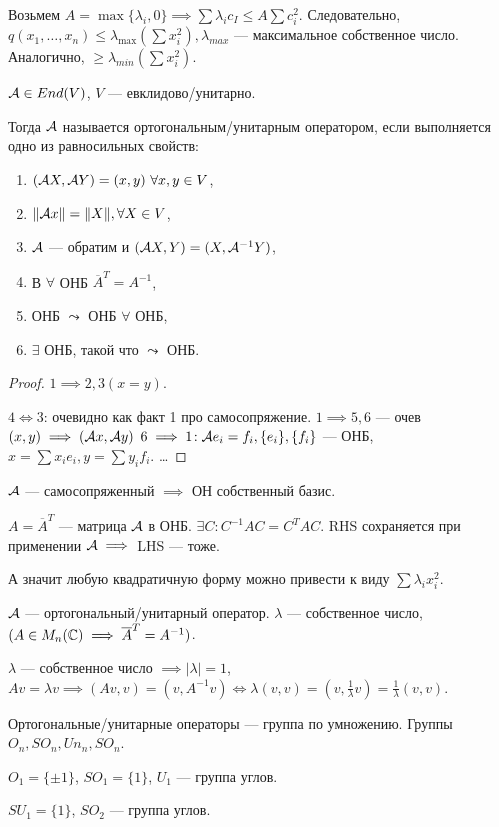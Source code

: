 Возьмем  $A = \max \{\lambda_i, 0\} \implies \sum \lambda_i c_I \le A \sum c_i^2$. Следовательно, $q(x_1, \ldots ,x_n) \le \lambda_{\max} (\sum x_i^2), \lambda_{max}$ --- максимальное собственное число.  Аналогично, $\ge \lambda_{min}(\sum x_i^2)$.
\begin{definition}
    $\mathcal{A} \in End(V)$,  $V$ --- евклидово/унитарно.

    Тогда  $\mathcal{A}$ называется ортогональным/унитарным оператором, если выполняется одно из равносильных свойств:
     \begin{enumerate}
         \item $(\mathcal{A} X, \mathcal{A} Y) = (x, y)\ \forall x, y \in V$,
         \item  $\|\mathcal{A} x\| = \|X\|, \forall X \in V$,
         \item  $\mathcal{A}$ --- обратим и  $(\mathcal{A} X, Y) = (X, \mathcal{A}^{-1}Y)$,
         \item В $\forall$ ОНБ  $\overline{A}^T = A^{-1}$,
         \item ОНБ  $\leadsto$ ОНБ  $\forall$ ОНБ,
         \item  $\exists$ ОНБ, такой что  $\leadsto$ ОНБ.
    \end{enumerate}
\end{definition}
\begin{proof}
    $1 \implies 2, 3 (x = y)$.

    $4 \iff 3$: очевидно как факт 1 про самосопряжение.
     $1 \implies 5, 6$ --- очев  $(x, y) \implies(\mathcal{A} x, \mathcal{A} y)$ 
     $6 \implies 1\!: \mathcal{A} e_i = f_i, \{e_i\}, \{f_i\}$ --- ОНБ,  $x = \sum x_i e_i, y = \sum y_i f_i$.  \dots
\end{proof}
\begin{remark}
    $\mathcal{A}$ --- самосопряженный  $\implies$ ОН собственный базис. 

    $A = \overline{A}^T$ --- матрица  $\mathcal{A}$ в ОНБ.  $\exists C\!: C^{-1}AC = C^{T}AC$. RHS сохраняется при применении  $\mathcal{A} \implies$ LHS --- тоже.

    А значит любую квадратичную форму можно привести к виду  $\sum \lambda_i x_i^2$.
\end{remark}
\begin{property}
    $\mathcal{A}$ --- ортогональный/унитарный оператор. $\lambda$ --- собственное число,  $(A \in M_n(\mathbb{C}) \implies \overline{A}^T = A^{-1})$. 
    
    $\lambda$ --- собственное число $\implies |\lambda| = 1$,  $Av = \lambda v \implies(Av, v) = (v, A^{-1}v) \iff \lambda(v, v) = (v, \frac{1}{\lambda}v) = \frac{1}{\lambda}(v, v)$.
\end{property}
\begin{remark}
    Ортогональные/унитарные операторы --- группа по умножению. Группы $O_n, SO_n, Un_n, SO_n$.
\end{remark}
\begin{example}
    $O_1 = \{\pm 1\}$, $SO_1 = \{1\}$, $U_1$ --- группа углов.
    
    $SU_1 = \{1\}$,  $SO_2$ --- группа углов.
\end{example}

